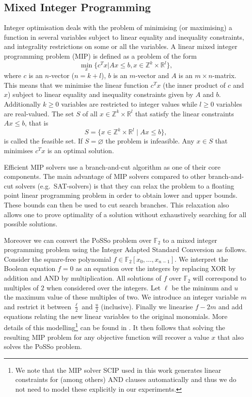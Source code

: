 \documentclass{llncs}
\newcommand{\field}[1]{\mathbb{#1}}
\newcommand{\F}{\field{F}}
\begin{document}
\subsection{Mixed Integer Programming}

Integer optimisation deals with the problem of minimising (or maximising) a function in several variables subject to linear equality and inequality constraints, and integrality restrictions on some or all the variables. A linear mixed integer programming problem (MIP) is defined as a problem of the form
\[
\underset{x}{\min}\{c^T x | Ax ≤ b, x ∈ \field{Z}^k × \field{R}^l\},
\]
where $c$ is an $n$-vector ($n = k + l$), $b$ is an $m$-vector and $A$ is an $m × n$-matrix. This means that we minimise the linear function $c^T x$ (the inner product of $c$ and $x$) subject to linear equality and inequality constraints given by $A$ and $b$. Additionally $k \geq 0$ variables are restricted to integer values while $l \geq 0$ variables are real-valued. The set $S$ of all $x ∈ \field{Z}^k × \field{R}^l$ that satisfy 
the linear constraints $Ax ≤ b$, that is
\[
S = \{x ∈ \field{Z}^k × \field{R}^l \mid Ax ≤ b\},
\]
is called the feasible set. If $S = \varnothing$ the problem is infeasible. Any $x \in S$ that minimises $c^T x$ is an optimal solution.

Efficient MIP solvers use a branch-and-cut algorithm as one of their core components. The main advantage of MIP solvers compared to other branch-and-cut solvers (e.g.\ SAT-solvers) is that they can relax the problem to a floating point linear programming problem in order to obtain lower and upper bounds. These bounds can then be used to cut search branches. This relaxation also allows one to prove optimality of a solution without exhaustively searching for all possible solutions.

Moreover we can convert the PoSSo problem over $\F_2$ to a mixed integer programming problem using the Integer Adapted Standard Conversion \cite{biviummip} as follows. Consider the square-free polynomial $f \in \F_2[x_0,\dots,x_{n-1}]$.  We interpret the Boolean equation $f = 0$ as an equation over the integers by replacing XOR by addition and AND by multiplication. All solutions of $f$ over $\F_2$ will correspond to multiples of $2$ when considered over the integers. Let $\ell$ be the mininum and $u$ the maximum value of these multiples of two. We introduce an integer variable $m$ and restrict it between $\frac{\ell}{2}$ and $\frac{u}{2}$ (inclusive). Finally we linearise $f - 2m$ and add equations relating the new linear variables to the original monomials. More details of this modelling\footnote{We note that the MIP solver SCIP \cite{scip} used in this work generates linear constraints for (among others) AND clauses automatically and thus we do not need to model these explicitly in our experiments.} can be found in \cite{biviummip}. It then follows that solving the resulting MIP problem for any objective function will recover a value $x$ that also solves the PoSSo problem.
\end{document}
